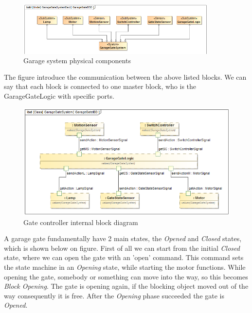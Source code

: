 \begin{figure}[!ht]
	\centering
	\includegraphics[width=100mm, keepaspectratio]{figures/magicDraw/bdd__GarageGateBDDcut.png}
	\caption{Garage system physical components}
	\label{fig:GarageBDD}
\end{figure}

The  figure introduce the communication between the above listed blocks. We can say that each block is connected to one master block, who is the GarageGateLogic with specific ports.

\begin{figure}[!ht]
	\centering
	\includegraphics[width=150mm, keepaspectratio]{figures/magicDraw/ibd__GarageGateSystem__GarageGateIBD.png}
	\caption{Gate controller internal block diagram}
	\label{fig:GateLogicComm}
\end{figure}

A garage gate fundamentally have 2 main states, the \textit{Opened} and \textit{Closed} states, which is shown below on  figure. First of all we can start from the initial \textit{Closed} state, where we can open the gate with an 'open' command. This command sets the state machine in an \textit{Opening} state, while starting the motor functions. While opening the gate, somebody or something can move into the way, so this becomes \textit{Block Opening}. The gate is opening again, if the blocking object moved out of the way consequently it is free. After the \textit{Opening} phase succeeded the gate is \textit{Opened}. 

